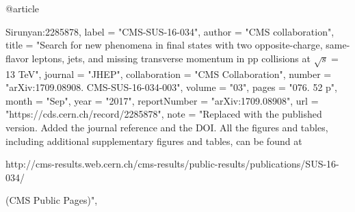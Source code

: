 @article{Sirunyan:2285878,
      label          = "CMS-SUS-16-034",
      author        = "{CMS collaboration}",
      title         = "{Search for new phenomena in final states with two
                       opposite-charge, same-flavor leptons, jets, and missing
                       transverse momentum in pp collisions at $\sqrt{s} = $ 13
                       TeV}",
      journal       = "JHEP",
      collaboration = "CMS Collaboration",
      number        = "arXiv:1709.08908. CMS-SUS-16-034-003",
      volume        = "03",
      pages         = "076. 52 p",
      month         = "Sep",
      year          = "2017",
      reportNumber  = "arXiv:1709.08908",
      url           = "https://cds.cern.ch/record/2285878",
      note          = "Replaced with the published version. Added the journal
                       reference and
  the DOI. All the figures and tables,
                       including additional supplementary
  figures and tables,
                       can be found at
 
                       http://cms-results.web.cern.ch/cms-results/public-results/publications/SUS-16-034/

                        (CMS Public Pages)",
}

